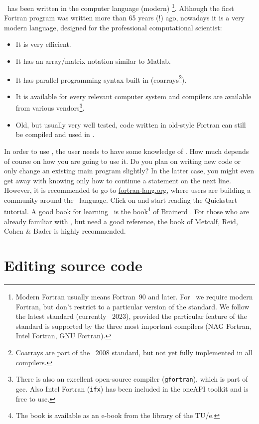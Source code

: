 \tfem\ has been written in the computer language (modern) \ftn\footnote{Modern Fortran usually means
Fortran~90 and later. For \tfem\ we require modern Fortran, but don't restrict to a particular version of
the standard. We follow the latest standard (currently \ftn~2023), provided the particular
feature of the standard is supported by the three most
important compilers (NAG Fortran, Intel Fortran, GNU Fortran).}. Although the first
Fortran program was written more than 65 years (!) ago, nowadays it is a very
modern language, designed for the professional computational scientist:
\begin{itemize}
   \item It is very efficient.
   \item It has an array/matrix notation similar to Matlab.
   \item It has parallel programming syntax built in (coarrays\footnote{
         Coarrays are part of the \ftn~2008 standard, but not yet fully implemented in
         all compilers.}).
   \item It is available for every relevant computer system and compilers are available from various
         vendors\footnote{There is also an excellent open-source compiler
         (\texttt{gfortran}), which is part of gcc. Also Intel Fortran (\texttt{ifx}) has been included in the oneAPI toolkit and is free to use.}.
   \item Old, but usually very well tested, code written in old-style
         Fortran can still be compiled and used in \ftn.
\end{itemize}
In order to use \tfem, the user needs to have
some knowledge of \ftn. How much depends
of course on how you are going to use it. Do you plan on writing new code or
only change an existing main program slightly? In the latter case, you might
even get away with knowing only how to continue a statement on the next line. However, it is recommended to
go to \href{https://fortran-lang.org}{fortran-lang.org}, where users are building a community around the \ftn\ language. Click on  and start reading the Quickstart tutorial.
A good book for learning
\ftn\ is the book\footnote{The book is available as an e-book from the library of the TU/e.} of Brainerd \cite{Brainerd2015}.
For those who are already familiar with \mftn, but need a good reference, the
book of Metcalf, Reid, Cohen \& Bader \cite{metcalf_modern_2024} is highly recommended.

\section{Editing source code}

